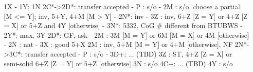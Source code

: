 1X - 1Y; 1N
2C*->2D*: transfer accepted
        - P  : s/o
        - 2M : s/o, choose a partial [M <= Y]; inv, 5+Y, 4+M [M > Y]
        - 2N*: inv
        - 3Z : inv, 6+Z [Z = Y] or 4+Z [Z = X] or 5+Z and 4Y [otherwise]
        - 3N*: 5332, CoG  # different from BTUBWS
   - 2Y*: max, 3Y
2D*: GF, ask 
   - 2M : 3M [M = Y] or 6M [M = X] or 4M [otherwise]
   - 2N : nat
   - 3X : good 5+X
2M : inv, 5+M [M = Y] or 4+M [otherwise], NF
2N*->3C*: transfer accepted
        - P  : s/o
        - 3D+: ... (TBD)
3Z : ST, 4+Z [Z = X] or semi-solid 6+Z [Z = Y] or 5+Z [otherwise]
3N : s/o
4C+: ... (TBD)
4Y : s/o
